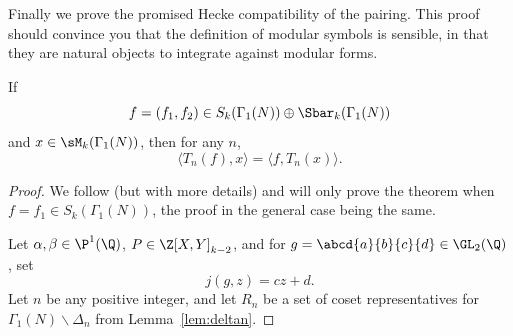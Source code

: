 Finally we prove the promised Hecke compatibility of the pairing.
This proof should convince you that the definition of modular symbols
is sensible, in that they are natural objects to
integrate against modular forms.
\begin{theorem}\label{thm:tequivar}
If $$f=(f_1,f_2)\in S_k(\Gamma_1(N)) \oplus \Sbar_k(\Gamma_1(N))$$ and
$x \in \sM_k(\Gamma_1(N))$, then for any $n$, 
$$
  \langle T_n(f), x \rangle = \langle f, T_n(x) \rangle.
$$
\end{theorem}
\begin{proof}
  We follow \cite[\S2.1]{merel:1585} (but with more details) and will
  only prove the theorem when $f=f_1\in S_k(\Gamma_1(N))$, the proof
  in the general case being the same.

Let $\alpha, \beta \in \P^1(\Q)$, $P\in \Z[X,Y]_{k-2}$,
and for $g=\abcd{a}{b}{c}{d}\in\GL_2(\Q)$, set 
$$j(g,z) = cz+d.$$  Let $n$ be any positive integer,
and let $R_n$ be a set of coset
representatives for $\Gamma_1(N)\backslash \Delta_n$ from
Lemma~\ref{lem:deltan}.


\end{proof}
